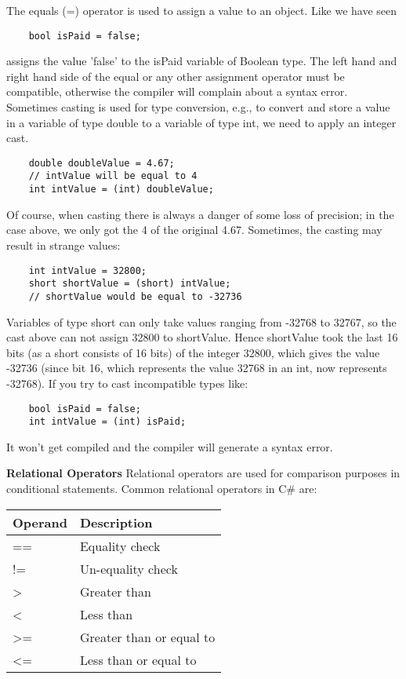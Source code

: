 The equals (=) operator is used to assign a value to an object. Like we have seen

\begin{lstlisting}
    bool isPaid = false;    
\end{lstlisting}

assigns the value ’false’ to the isPaid variable of Boolean type. The left hand and right hand side of the equal or any
other assignment operator must be compatible, otherwise the compiler will complain about a syntax error.
Sometimes casting is used for type conversion, e.g., to convert and store a value in a variable of type double to a
variable of type int, we need to apply an integer cast.

\begin{lstlisting}
    double doubleValue = 4.67;
    // intValue will be equal to 4
    int intValue = (int) doubleValue;
\end{lstlisting}

Of course, when casting there is always a danger of some loss of precision; in the case above, we only got the 4 of
the original 4.67. Sometimes, the casting may result in strange values:

\begin{lstlisting}
    int intValue = 32800;
    short shortValue = (short) intValue;
    // shortValue would be equal to -32736        
\end{lstlisting}

Variables of type short can only take values ranging from -32768 to 32767, so the cast above can not assign 32800
to shortValue. Hence shortValue took the last 16 bits (as a short consists of 16 bits) of the integer 32800, which
gives the value -32736 (since bit 16, which represents the value 32768 in an int, now represents -32768). If you try
to cast incompatible types like:

\begin{lstlisting}
    bool isPaid = false;
    int intValue = (int) isPaid;        
\end{lstlisting}

It won’t get compiled and the compiler will generate a syntax error.

\textbf{Relational Operators}
Relational operators are used for comparison purposes in conditional statements. Common relational operators in
C\# are:

\begin{center}
    \begin{tabular}{ | m{5em} | m{10cm} | } 
    \hline
    Operand & Description \\
    \hline
    == & Equality check\\
    != & Un-equality check\\
    > & Greater than\\
    < & Less than\\
    >= & Greater than or equal to\\
    <= & Less than or equal to\\
    \hline
    \end{tabular}
\end{center}

